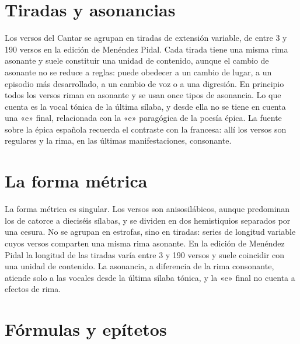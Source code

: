 \documentclass{book}
\begin{document}

\section{Tiradas y asonancias}

Los versos del Cantar se agrupan en tiradas de extensión variable, de entre 3 y 190 versos en la edición de Menéndez Pidal. Cada tirada tiene una misma rima asonante y suele constituir una unidad de contenido, aunque el cambio de asonante no se reduce a reglas: puede obedecer a un cambio de lugar, a un episodio más desarrollado, a un cambio de voz o a una digresión. En principio todos los versos riman en asonante y se usan once tipos de asonancia. Lo que cuenta es la vocal tónica de la última sílaba, y desde ella no se tiene en cuenta una «e» final, relacionada con la «e» paragógica de la poesía épica. La fuente sobre la épica española recuerda el contraste con la francesa: allí los versos son regulares y la rima, en las últimas manifestaciones, consonante.


\section{La forma métrica}

La forma métrica es singular. Los versos son anisosilábicos, aunque predominan los de catorce a dieciséis sílabas, y se dividen en dos hemistiquios separados por una cesura. No se agrupan en estrofas, sino en tiradas: series de longitud variable cuyos versos comparten una misma rima asonante. En la edición de Menéndez Pidal la longitud de las tiradas varía entre 3 y 190 versos y suele coincidir con una unidad de contenido. La asonancia, a diferencia de la rima consonante, atiende solo a las vocales desde la última sílaba tónica, y la «e» final no cuenta a efectos de rima.


\section{Fórmulas y epítetos}
\end{document}
